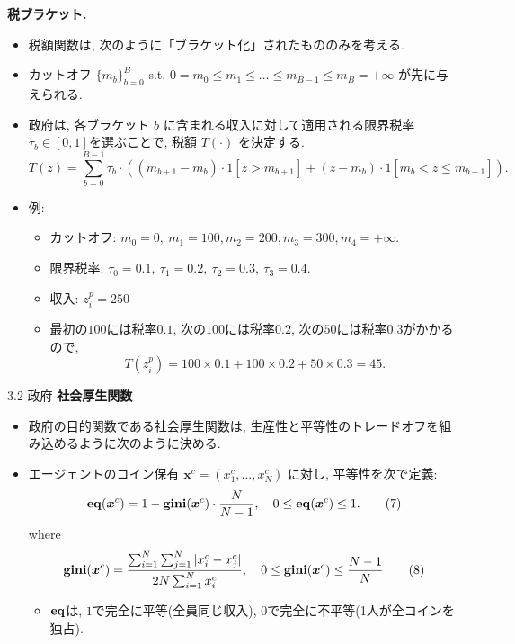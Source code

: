 \documentclass[unicode,aspectratio=169,11pt]{beamer}
\begin{document}
\begin{frame}{}{}
{\bf 税ブラケット.}
\begin{itemize}
    \item 税額関数は, 次のように「ブラケット化」されたもののみを考える.
    \item カットオフ $\{m_b\}_{b = 0}^B$ s.t. $0 = m_0 \le m_1 \le \dots \le m_{B-1}\le m_B = +\infty$ が先に与えられる.
    \item 政府は, 各ブラケット $b$ に含まれる収入に対して適用される限界税率 $\tau_b \in [0,1]$を選ぶことで, 税額 $T(\cdot)$ を決定する.
    \[ T(z) = \sum_{b = 0}^{B-1} \tau_b \cdot \left((m_{b+1}-m_{b}) \cdot 1[z > m_{b+1}] + (z - m_b)\cdot 1[m_b < z \le m_{b+1}]\right).\]
    \item 例:
    \begin{itemize}
        \item カットオフ: $m_0 = 0,\ m_1 = 100, m_2 = 200, m_3 = 300, m_4 = +\infty$.
        \item 限界税率: $\tau_0 = 0.1,\ \tau_1 = 0.2,\ \tau_2 = 0.3,\ \tau_3 = 0.4$.
        \item 収入: $z_i^p = 250$
        \item 最初の$100$には税率$0.1$, 次の$100$には税率$0.2$, 次の$50$には税率$0.3$がかかるので,
        \[ T(z_i^p) = 100 \times 0.1 + 100 \times 0.2 + 50 \times 0.3 = 45. \]
    \end{itemize}
\end{itemize}
\end{frame}

\begin{frame}{3.2 政府}{}
{\bf 社会厚生関数}
\begin{itemize}
    \item 政府の目的関数である社会厚生関数は, 生産性と平等性のトレードオフを組み込めるように次のように決める.
    \item エージェントのコイン保有 $\bm{x}^c = (x_1^c, \dots, x_N^c)$ に対し, 平等性を次で定義:
    \[ {\bf{eq}}(\bm{x}^c) = 1 - {\bf{gini}}(\bm{x}^c)\cdot \frac{N}{N-1},\ \ \ 0 \le {\bf eq}(\bm{x}^c)\le 1.\tag{7} \]
    where
    \[ {\bf{gini}}(\bm{x}^c) = \frac{\sum_{i=1}^N\sum_{j=1}^N |x_{i}^c - x_{j}^c|}{2N \sum_{i=1}^N x_{i}^c},
    \ \ \ 0 \le {\bf gini}(\bm{x}^c) \le \frac{N-1}{N}\tag{8} \]
    \begin{itemize}
        \item ${\bf eq}$は, $1$で完全に平等(全員同じ収入), $0$で完全に不平等(1人が全コインを独占).
    \end{itemize}
\end{itemize}
\end{frame}
\end{document}
